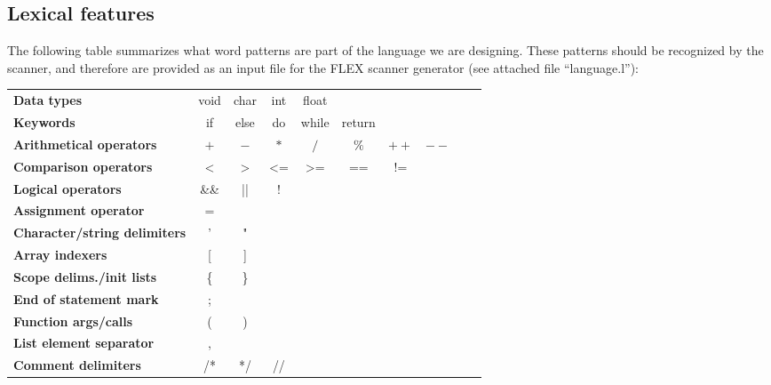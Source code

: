 \subsection{Lexical features}
The following table summarizes what word patterns are part of the language we are designing.
These patterns should be recognized by the scanner, and therefore are provided as an input file
for the FLEX \cite{FLEX} scanner generator (see attached file ``language.l''):

{
\small
\begin{tabular}{lccccccccc}
\textbf{Data types}                      & void & char & int & float &         &      &      &   &   \\
\textbf{Keywords}                        & if   & else & do  & while & return  &      &      &   &   \\
\textbf{Arithmetical operators}          & $+$  & $-$  & $*$ & $/$   & $\%$    & $++$ & $--$ &   &   \\
\textbf{Comparison operators}            & <    & >    & <=  & >=    & ==      & !=   &      &   &   \\
\textbf{Logical operators}               & \&\& & ||   & !   &       &         &      &      &   &   \\
\textbf{Assignment operator}             & =    &      &     &       &         &      &      &   &   \\
\textbf{Character/string delimiters}     & '    & "    &     &       &         &      &      &   &   \\
\textbf{Array indexers}                  & [    & ]    &     &       &         &      &      &   &   \\
\textbf{Scope delims./init lists}        & \{   & \}   &     &       &         &      &      &   &   \\
\textbf{End of statement mark}           & ;    &      &     &       &         &      &      &   &   \\
\textbf{Function args/calls}             & (    & )    &     &       &         &      &      &   &   \\
\textbf{List element separator}          & ,    &      &     &       &         &      &      &   &   \\
\textbf{Comment delimiters}              & /*   & */   & //  &       &         &      &      &   &   \\
\end{tabular}

}
